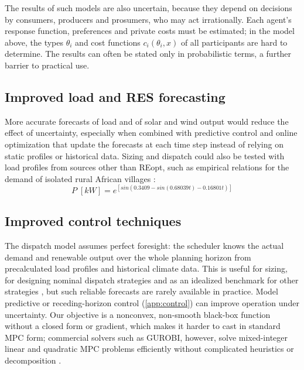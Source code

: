 \documentclass[final,3p,times]{elsarticle}
\begin{document}
The results of such models are also uncertain, because they depend on decisions by consumers, producers and prosumers, who may act irrationally. Each agent's response function, preferences and private costs must be estimated; in the model above, the types $\theta_i$ and cost functions $c_i(\theta_i,x)$ of all participants are hard to determine. The results can often be stated only in probabilistic terms, a further barrier to practical use.

\subsection{Improved load and RES forecasting}

More accurate forecasts of load and of solar and wind output would reduce the effect of uncertainty, especially when combined with predictive control and online optimization that update the forecasts at each time step instead of relying on static profiles or historical data. Sizing and dispatch could also be tested with load profiles from sources other than REopt, such as empirical relations for the demand of isolated rural African villages \cite{load_profile}:
\begin{equation}
    P \; [kW] = e^{[sin(0.3409 - sin(0.68039t) - 0.16801t)]}
\end{equation}


\subsection{Improved control techniques \label{app:improvements}}

The dispatch model assumes perfect foresight: the scheduler knows the actual demand and renewable output over the whole planning horizon from precalculated load profiles and historical climate data. This is useful for sizing, for designing nominal dispatch strategies and as an idealized benchmark for other strategies \cite{parisio2014}, but such reliable forecasts are rarely available in practice. Model predictive or receding-horizon control (\cref{app:control}) can improve operation under uncertainty. Our objective is a nonconvex, non-smooth black-box function without a closed form or gradient, which makes it harder to cast in standard MPC form; commercial solvers such as GUROBI, however, solve mixed-integer linear and quadratic MPC problems efficiently without complicated heuristics or decomposition \cite{parisio2014}.
\end{document}
